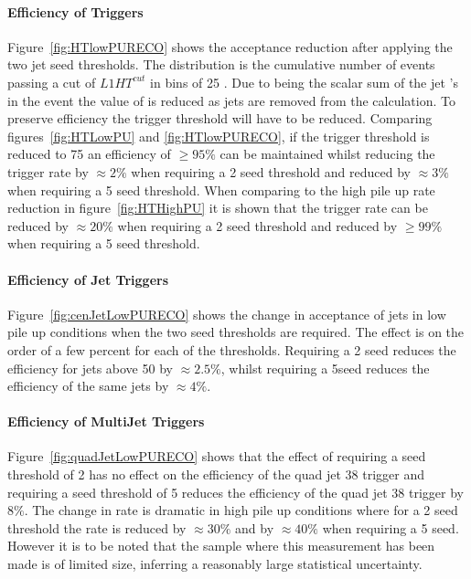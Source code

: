 \paragraph{Efficiency of \HT Triggers} %
\label{par:Efficneicy of HT triggers}
Figure~\ref{fig:HTlowPURECO} shows the acceptance reduction after applying the 
two jet seed thresholds. The distribution is the cumulative number of events 
passing a cut of $L1 HT^{cut}$ in bins of 25 \GeV. Due to \HT being the scalar 
sum of the jet \PT's in the event the value of \Lone \HT is reduced as jets are 
removed from the calculation. To preserve efficiency the \Lone trigger 
threshold will have to be reduced. Comparing figures~\ref{fig:HTLowPU} and 
\ref{fig:HTlowPURECO}, if the trigger threshold is reduced to 75 \GeV an 
efficiency of $\geq 95\%$ can be maintained whilst reducing the trigger rate by 
$\approx 2\%$ when requiring a 2 \GeV seed threshold and reduced by $\approx 
3\%$ when requiring a 5 \GeV seed threshold. When comparing to the high pile up 
rate reduction in figure~\ref{fig:HTHighPU} it is shown that the trigger rate 
can be reduced by $\approx 20\%$ when requiring a 2 \GeV seed threshold and
reduced by $\geq 99\%$ when requiring a 5 \GeV seed threshold.


\paragraph{Efficiency of Jet Triggers} %
\label{par:Efficiency of Jet Triggers}
Figure~\ref{fig:cenJetLowPURECO} shows the change in acceptance of jets in low 
pile up conditions when the two seed thresholds are required. The effect is on 
the order of a few percent for each of the thresholds. Requiring a 2 \GeV seed 
reduces the efficiency for jets above 50 \GeV by $\approx 2.5\%$, whilst 
requiring a 5\GeV seed reduces the efficiency of the same jets by $\approx 4\%$.

\paragraph{Efficiency of MultiJet Triggers} %
\label{par:Efficiency of MultiJet Triggers}
Figure~\ref{fig:quadJetLowPURECO} shows that the effect of requiring a seed 
threshold of 2 \GeV has no effect on the efficiency of the quad jet 38 \GeV 
trigger and requiring a seed threshold of 5 \GeV reduces the efficiency of the 
quad jet 38 trigger by $8\%$. The change in rate is dramatic in high pile up 
conditions where for a 2 \GeV seed threshold the rate is reduced by 
$\approx 30\%$ and by $\approx 40\%$ when requiring a 5 \GeV seed.
However it is to be noted that the sample where this measurement has been made 
is of limited size, inferring a reasonably large statistical uncertainty. 



